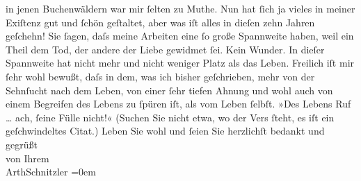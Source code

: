 \begin{ledgroupsized}[t]{13cm}
               in jenen Buchenwäldern war mir ſelten zu Muthe. Nun hat ſich ja vieles in meiner
               Exiſtenz gut und ſchön geſtaltet, aber was iſt alles in dieſen zehn Jahren geſchehn!
               Sie ſagen, daſs meine Arbeiten eine ſo große Spannweite haben, weil ein Theil dem
               Tod, der andere der Liebe gewidmet {\pb}ſei. Kein
               Wunder. In dieſer Spannweite hat nicht mehr und nicht weniger Platz als das Leben.
               Freilich iſt mir ſehr wohl bewußt, daſs in dem, was ich bisher geſchrieben, mehr von
               der Sehnſucht nach dem Leben, von einer ſehr tiefen Ahnung und wohl auch von einem
               Begreifen des Lebens zu ſpüren iſt, als vom Leben ſelbſt. »Des Lebens Ruf {\dots} ach, ſeine Fülle nicht!« (Suchen Sie nicht etwa, wo der
               Vers {\pb}ſteht, es iſt ein geſchwindeltes Citat.)\pend
           \pstart
           Leben Sie wohl und ſeien Sie herzlichſt bedankt und gegrüßt{\\[\baselineskip]}von Ihrem{\\[\baselineskip]}\spacefill\mbox{ArthSchnitzler}\pend
           \leftskip=0em{}
         
         \endnumbering{}\end{ledgroupsized}  \newcommand{\dateiname}{L01590}\newcommand{\titel}{Arthur Schnitzler an Georg Brandes, 13. 3. 1906}\newcommand{\editorInnen}{Martin Anton Müller und Gerd-Hermann Susen}
      